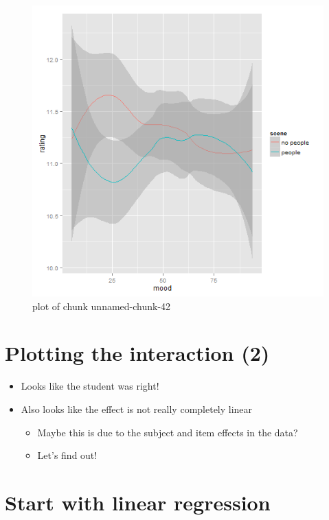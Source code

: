 \documentclass[]{article}
\begin{document}
\begin{figure}[htbp]
\centering
\includegraphics{Class6-figure/unnamed-chunk-42.png}
\caption{plot of chunk unnamed-chunk-42}
\end{figure}

\section{Plotting the interaction
(2)}\label{plotting-the-interaction-2-1}

\begin{itemize}
\itemsep1pt\parskip0pt
\item
  Looks like the student was right!
\item
  Also looks like the effect is not really completely linear

  \begin{itemize}
  \itemsep1pt\parskip0pt
  \item
    Maybe this is due to the subject and item effects in the data?
  \item
    Let's find out!
  \end{itemize}
\end{itemize}

\section{Start with linear
regression}\label{start-with-linear-regression}
\end{document}
